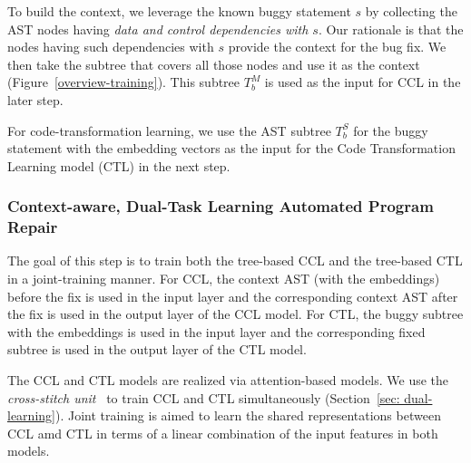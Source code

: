 To build the context, we leverage the known buggy statement $s$ by
collecting the AST nodes having {\em data and control dependencies
  with $s$}. Our rationale is that the nodes having such dependencies
with $s$ provide the context for the bug fix.
%
We then take the subtree that covers all those nodes and use it as the
context (Figure~\ref{overview-training}). This subtree $T_b^{M}$ is
used as the input for CCL in the later step.

For code-transformation learning, we use the AST subtree $T_b^{S}$ for
the buggy statement with the embedding vectors as the input for the
Code Transformation Learning model (CTL) in the next step.


\subsubsection{Context-aware, Dual-Task Learning Automated Program
  Repair}

The goal of this step is to train both the tree-based CCL and the
tree-based CTL in a joint-training manner. For CCL, the context AST
(with the embeddings) before the fix is used in the input layer and
the corresponding context AST after the fix is used in the output
layer of the CCL model. For CTL, the buggy subtree with the embeddings
is used in the input layer and the corresponding fixed subtree is used
in the output layer of the CTL model.

The CCL and CTL models are realized via attention-based 
models. We use the {\em cross-stitch unit}~\cite{misra2016cross} to
train CCL and CTL simultaneously (Section~\ref{sec: dual-learning}).
Joint training is aimed to learn the shared representations between
CCL amd CTL in terms of a linear combination of the input features in
both models.

